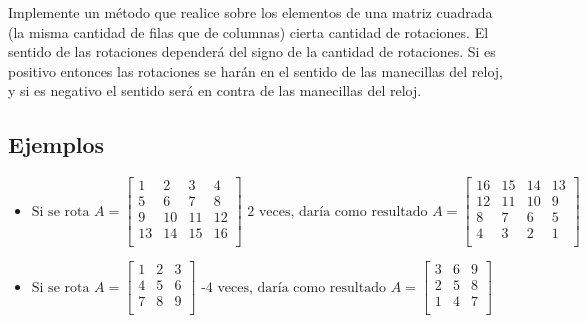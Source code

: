 Implemente un método que realice sobre los elementos de una matriz cuadrada (la misma cantidad de filas que de columnas) cierta cantidad de rotaciones. El sentido de las rotaciones dependerá del signo de la cantidad de rotaciones. Si es positivo entonces las rotaciones se harán en el sentido de las manecillas del reloj, y si es negativo el sentido será en contra de las manecillas del reloj.

\subsection*{Ejemplos}
\begin{itemize}
    \item \( \text{Si se rota } A = 
        \begin{bmatrix}
        1 & 2 & 3 & 4 \\
        5 & 6 & 7 & 8 \\
        9 & 10 & 11 & 12 \\
        13 & 14 & 15 & 16 \\
        \end{bmatrix}
        \text{ 2 veces, daría como resultado }
        A = 
        \begin{bmatrix}
        16 & 15 & 14 & 13 \\
        12 & 11 & 10 & 9 \\
        8 & 7 & 6 & 5 \\
        4 & 3 & 2 & 1 \\
        \end{bmatrix}
        \)
    \item \( \text{Si se rota } A = 
        \begin{bmatrix}
        1 & 2 & 3 \\
        4 & 5 & 6 \\
        7 & 8 & 9 \\
        \end{bmatrix}
        \text{ -4 veces, daría como resultado }
        A = 
        \begin{bmatrix}
        3 & 6 & 9 \\
        2 & 5 & 8 \\
        1 & 4 & 7 \\
        \end{bmatrix}
        \)
\end{itemize}
